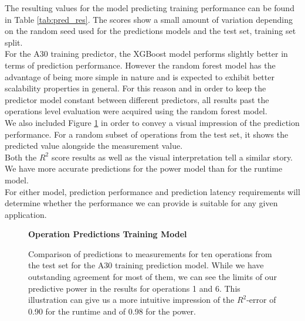 The resulting values for the model predicting training performance can be found in Table \ref{tab:pred_res}. The scores show a small amount of variation depending on the random seed used for the predictions models and the test set, training set split. \\
For the A30 training predictor, the XGBoost model performs slightly better in terms of prediction performance. However the random forest model has the advantage of being more simple in nature and is expected to exhibit better scalability properties in general. For this reason and in order to keep the predictor model constant between different predictors, all results past the operations level evaluation were acquired using the random forest model. \\
We also included Figure \ref{fig:testsetoperations} in order to convey a visual impression of the prediction performance. For a random subset of operations from the test set, it shows the predicted value alongside the measurement value. \\
Both the $R^2$ score results as well as the visual interpretation tell a similar story. We have more accurate predictions for the power model than for the runtime model. \\
For either model, prediction performance and prediction latency requirements will determine whether the performance we can provide is suitable for any given application.


\begin{figure}[htbp]
    \centering
    \parbox{1.1\textwidth}{\centering\textbf{Operation Predictions Training Model}}
    \caption{Comparison of predictions to measurements for ten operations from the test set for the A30 training prediction model. While we have outstanding agreement for most of them, we can see the limits of our predictive power in the results for operations 1 and 6. This illustration can give us a more intuitive impression of the $R^2$-error of 0.90 for the runtime and of 0.98 for the power.}
    \label{fig:testsetoperations}
\end{figure}


